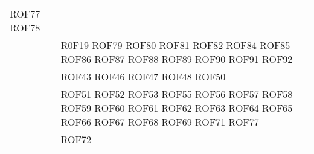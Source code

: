 \documentclass[../DefinizioneDiProdotto.tex]{subfiles}
\begin{document}
\begin{longtable}{p{8.5cm}!{\VRule[1pt]}p{2.5cm}}
ROF77 \newline 
ROF78 \\
 & R0F19 \newline 
ROF79 \newline 
ROF80 \newline 
ROF81 \newline 
ROF82 \newline 
ROF84 \newline 
ROF85 \newline 
ROF86 \newline 
ROF87 \newline 
ROF88 \newline 
ROF89 \newline 
ROF90 \newline 
ROF91 \newline 
ROF92 \\
 & ROF43 \newline 
ROF46 \newline 
ROF47 \newline 
ROF48 \newline 
ROF50 \\
 & ROF51 \newline 
ROF52 \newline 
ROF53 \newline 
ROF55 \newline 
ROF56 \newline 
ROF57 \newline 
ROF58 \newline 
ROF59 \newline 
ROF60 \newline 
ROF61 \newline 
ROF62 \newline 
ROF63 \newline 
ROF64 \newline 
ROF65 \newline 
ROF66 \newline 
ROF67 \newline 
ROF68 \newline 
ROF69 \newline 
ROF71 \newline 
ROF77 \\
 & ROF72 \newline 

\end{longtable}
\end{document}
